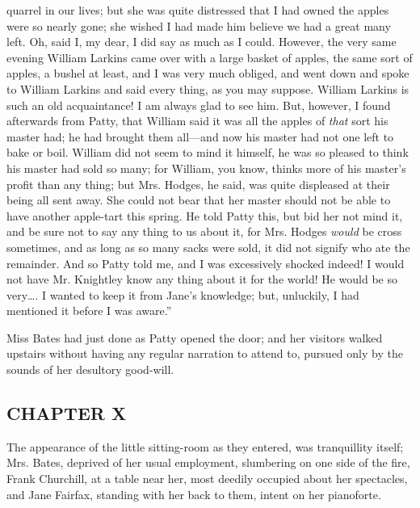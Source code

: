 quarrel in our lives; but she was quite distressed that I had owned the apples were so nearly gone; she wished I had made him believe we had a great many left. Oh, said I, my dear, I did say as much as I could. However, the very same evening William Larkins came over with a large basket of apples, the same sort of apples, a bushel at least, and I was very much obliged, and went down and spoke to William Larkins and said every thing, as you may suppose. William Larkins is such an old acquaintance! I am always glad to see him. But, however, I found afterwards from Patty, that William said it was all the apples of {\em that} sort his master had; he had brought them all---and now his master had not one left to bake or boil. William did not seem to mind it himself, he was so pleased to think his master had sold so many; for William, you know, thinks more of his master's profit than any thing; but Mrs. Hodges, he said, was quite displeased at their being all sent away. She could not bear that her master should not be able to have another apple-tart this spring. He told Patty this, but bid her not mind it, and be sure not to say any thing to us about it, for Mrs. Hodges {\em would} be cross sometimes, and as long as so many sacks were sold, it did not signify who ate the remainder. And so Patty told me, and I was excessively shocked indeed! I would not have Mr. Knightley know any thing about it for the world! He would be so very\ldots{}. I wanted to keep it from Jane's knowledge; but, unluckily, I had mentioned it before I was aware.”

Miss Bates had just done as Patty opened the door; and her visitors walked upstairs without having any regular narration to attend to, pursued only by the sounds of her desultory good-will.


\subsection[chapter-x-1]{\useURL[url29][][][]\from[url29]CHAPTER X}

The appearance of the little sitting-room as they entered, was tranquillity itself; Mrs. Bates, deprived of her usual employment, slumbering on one side of the fire, Frank Churchill, at a table near her, most deedily occupied about her spectacles, and Jane Fairfax, standing with her back to them, intent on her pianoforte.

